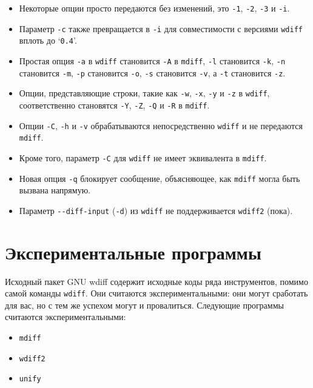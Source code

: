 \begin{itemize}
\item
  Некоторые опции просто передаются без изменений, это \texttt{-1},
  \texttt{-2}, \texttt{-3} и \texttt{-i}.
\item
  Параметр \texttt{-c} также превращается в \texttt{-i} для
  совместимости с версиями \texttt{wdiff} вплоть до `\texttt{0.4}'.
\item
  Простая опция \texttt{-a} в \texttt{wdiff} становится \texttt{-A} в
  \texttt{mdiff}, \texttt{-l} становится \texttt{-k}, \texttt{-n}
  становится \texttt{-m}, \texttt{-p} становится \texttt{-o},
  \texttt{-s} становится \texttt{-v}, а \texttt{-t} становится
  \texttt{-z}.
\item
  Опции, представляющие строки, такие как \texttt{-w}, \texttt{-x},
  \texttt{-y} и \texttt{-z} в \texttt{wdiff}, соответственно становятся
  \texttt{-Y}, \texttt{-Z}, \texttt{-Q} и \texttt{-R} в \texttt{mdiff}.
\item
  Опции \texttt{-C}, \texttt{-h} и \texttt{-v} обрабатываются
  непосредственно \texttt{wdiff} и не передаются \texttt{mdiff}.
\item
  Кроме того, параметр \texttt{-C} для \texttt{wdiff} не имеет
  эквивалента в \texttt{mdiff}.
\item
  Новая опция \texttt{-q} блокирует сообщение, объясняющее, как
  \texttt{mdiff} могла быть вызвана напрямую.
\item
  Параметр \texttt{-\/-diff-input} (\texttt{-d}) из \texttt{wdiff} не
  поддерживается \texttt{wdiff2} (пока).
\end{itemize}

\hypertarget{Experimental}{%
\section{Экспериментальные программы}\label{Experimental}}

Исходный пакет GNU wdiff содержит исходные коды ряда инструментов,
помимо самой команды \texttt{wdiff}. Они считаются экспериментальными:
они могут сработать для вас, но с тем же успехом могут и провалиться.
Следующие программы считаются экспериментальными:

\begin{itemize}
\item
  \texttt{mdiff}
\item
  \texttt{wdiff2}
\item
  \texttt{unify}
\end{itemize}

